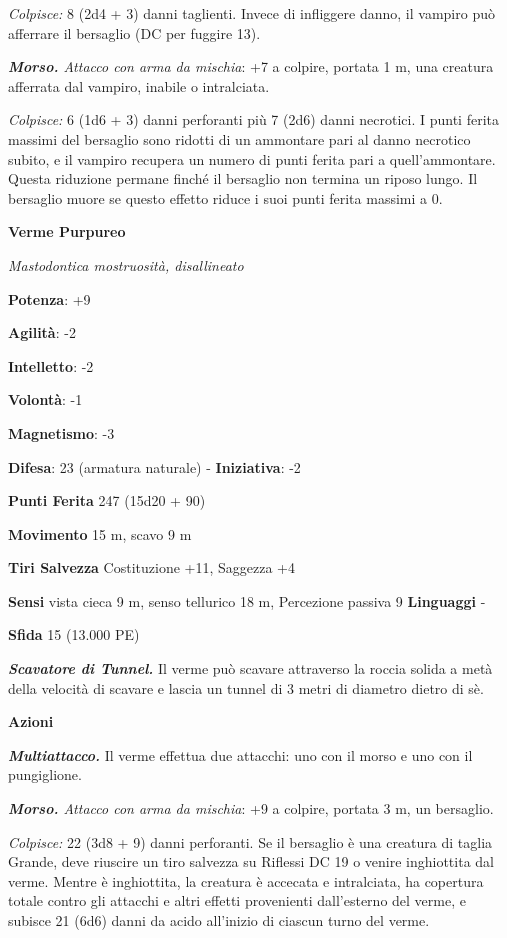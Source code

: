 \begin{multicols}{2}
\emph{Colpisce:} 8 (2d4 + 3) danni taglienti. Invece di infliggere
danno, il vampiro può afferrare il bersaglio (DC per fuggire 13).

\emph{\textbf{Morso.} Attacco con arma da mischia}: +7 a colpire,
portata 1 m, una creatura afferrata dal vampiro, inabile o
intralciata.

\emph{Colpisce:} 6 (1d6 + 3) danni perforanti più 7 (2d6) danni
necrotici. I punti ferita massimi del bersaglio sono ridotti di un
ammontare pari al danno necrotico subito, e il vampiro recupera un
numero di punti ferita pari a quell'ammontare. Questa riduzione permane
finché il bersaglio non termina un riposo lungo. Il bersaglio muore se
questo effetto riduce i suoi punti ferita massimi a 0.

\textbf{Verme Purpureo}

\emph{Mastodontica mostruosità, disallineato}

\textbf{Potenza}: +9

\textbf{Agilità}: -2

\textbf{Intelletto}: -2

\textbf{Volontà}: -1

\textbf{Magnetismo}: -3

\textbf{Difesa}: 23 (armatura naturale) - \textbf{Iniziativa}: -2

\textbf{Punti Ferita} 247 (15d20 + 90)

\textbf{Movimento} 15 m, scavo 9 m

\textbf{Tiri Salvezza} Costituzione +11, Saggezza +4

\textbf{Sensi} vista cieca 9 m, senso tellurico 18 m, Percezione passiva
9 \textbf{Linguaggi} -

\textbf{Sfida} 15 (13.000 PE)\smallskip

\emph{\textbf{Scavatore di Tunnel.}} Il verme può scavare attraverso la
roccia solida a metà della velocità di scavare e lascia un tunnel di 3
metri di diametro dietro di sè.

\smallskip\textbf{Azioni}

\emph{\textbf{Multiattacco.}} Il verme effettua due attacchi: uno con il
morso e uno con il pungiglione.

\emph{\textbf{Morso.} Attacco con arma da mischia}: +9 a colpire,
portata 3 m, un bersaglio.

\emph{Colpisce:} 22 (3d8 + 9) danni perforanti. Se il bersaglio è una
creatura di taglia Grande, deve riuscire un tiro salvezza su Riflessi
DC 19 o venire inghiottita dal verme. Mentre è inghiottita, la creatura
è accecata e intralciata, ha copertura totale contro gli attacchi e
altri effetti provenienti dall'esterno del verme, e subisce 21 (6d6)
danni da acido all'inizio di ciascun turno del verme.


\end{multicols}
